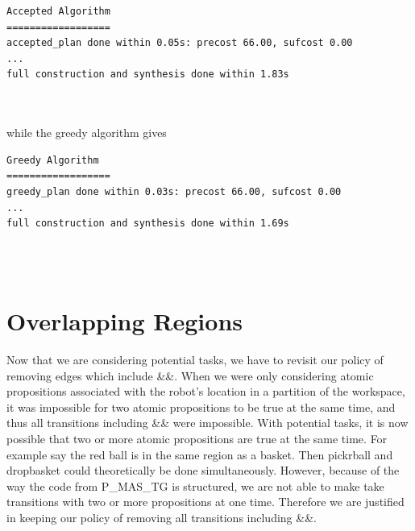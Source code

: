 \begin{minipage}{\textwidth}
\begingroup
\fontsize{9pt}{12pt}\selectfont
\begin{lstlisting}
Accepted Algorithm
==================
accepted_plan done within 0.05s: precost 66.00, sufcost 0.00
...
full construction and synthesis done within 1.83s 
\end{lstlisting}
\endgroup
\end{minipage} \\ \\


while the greedy algorithm gives \\


\begin{minipage}{\textwidth}
\begingroup
\fontsize{9pt}{12pt}\selectfont
\begin{lstlisting}
Greedy Algorithm
==================
greedy_plan done within 0.03s: precost 66.00, sufcost 0.00
...
full construction and synthesis done within 1.69s
\end{lstlisting}
\endgroup
\end{minipage} \\ \\


\section{Overlapping Regions}
Now that we are considering potential tasks, we have to revisit our policy of removing edges which include \&\&. When we were only considering atomic propositions associated with the robot's location in a partition of the workspace, it was impossible for two atomic propositions to be true at the same time, and thus all transitions including \&\& were impossible. With potential tasks, it is now possible that two or more atomic propositions are true at the same time. For example say the red ball is in the same region as a basket. Then pickrball and dropbasket could theoretically be done simultaneously. However, because of the way the code from P\_MAS\_TG \cite{pMasGit} is structured, we are not able to make take transitions with two or more propositions at one time. Therefore we are justified in keeping our policy of removing all transitions including \&\&. 






